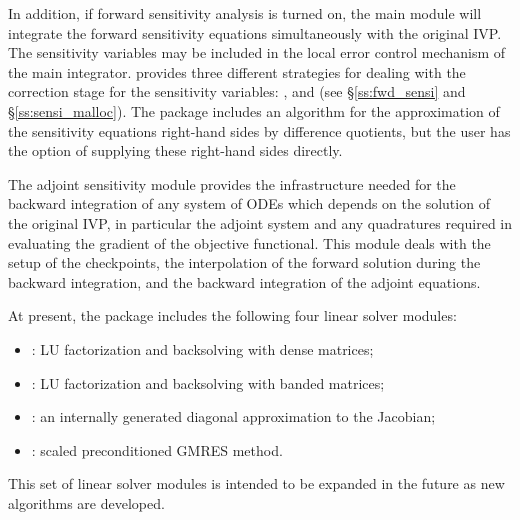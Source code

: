 In addition, if forward sensitivity analysis is turned on, the main module 
will integrate the forward sensitivity equations simultaneously with the original IVP.
The sensitivity variables may be included in the local error control
mechanism of the main integrator.
{\cvodes} provides three different strategies for dealing with the correction
stage for the sensitivity variables: ,  and
 (see \S\ref{ss:fwd_sensi} and \S\ref{ss:sensi_malloc}).
The {\cvodes} package includes an algorithm for the approximation of the sensitivity 
equations right-hand sides by difference quotients, but the user has the option of 
supplying these right-hand sides directly.

The adjoint sensitivity module provides the infrastructure needed for the 
backward integration of any system of ODEs which depends on the solution 
of the original IVP, in particular the adjoint system and any quadratures required
in evaluating the gradient of the objective functional.
This module deals with the setup of the checkpoints, the interpolation of the forward 
solution during the backward integration, and the backward integration of the adjoint
equations. 


At present, the package includes the following four {\cvodes} linear solver
modules:
\begin{itemize} 
\item {\cvdense}: LU factorization and backsolving with dense matrices; 
\item {\cvband}: LU factorization and backsolving with banded matrices; 
\item {\cvdiag}: an internally generated diagonal approximation to the 
Jacobian; 
\item {\cvspgmr}: scaled preconditioned GMRES method.
\end{itemize}
This set of linear solver modules is intended to be expanded in the
future as new algorithms are developed.

